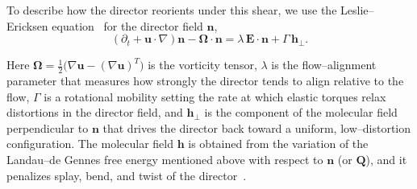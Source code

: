 \documentclass[11pt]{article}
\begin{document}
To describe how the director reorients under this shear, we use the Leslie–Ericksen equation~\cite{leslie1968some} for the director field $\mathbf{n}$,
\begin{equation}
    (\partial_t + \mathbf{u}\!\cdot\!\nabla)\mathbf{n}
    - \boldsymbol{\Omega}\!\cdot\!\mathbf{n}
    = \lambda\,\mathbf{E}\!\cdot\!\mathbf{n}
    + \Gamma\,\mathbf{h}_\perp.
    \label{eq:Leslie--ericksen}
\end{equation}

Here $\boldsymbol{\Omega}=\tfrac12\big(\nabla\mathbf{u}-(\nabla\mathbf{u})^T\big)$ is the vorticity tensor, $\lambda$ is the flow–alignment parameter that measures how strongly the director tends to align relative to the flow, $\Gamma$ is a rotational mobility setting the rate at which elastic torques relax distortions in the director field, and $\mathbf{h}_\perp$ is the component of the molecular field perpendicular to $\mathbf{n}$ that drives the director back toward a uniform, low–distortion configuration. The molecular field $\mathbf{h}$ is obtained from the variation of the Landau--de Gennes free energy mentioned above with respect to $\mathbf{n}$ (or $\mathbf{Q}$), and it penalizes splay, bend, and twist of the director~\cite{degennes1993physics,beris1994thermodynamics}.
\end{document}
